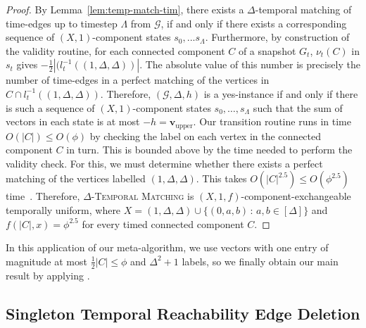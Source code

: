 \documentclass[a4paper,UKenglish,cleveref, autoref, thm-restate]{lipics-v2021} %
\begin{document}
\begin{toappendix}
\begin{proof}
    By Lemma~\ref{lem:temp-match-tim}, there exists a $\Delta$-temporal matching of time-edges up to timestep $\Lambda$ from $\mathcal{G}$, if and only if there exists a corresponding sequence of $(X,1)$-component states $s_0, ... s_{\Lambda}$. Furthermore, by construction of the validity routine, for each connected component $C$ of a snapshot $G_t$, $\nu_t(C)$ in $s_t$ gives $-\frac{1}{2}|(l_t^{-1}((1,\Delta,\Delta))|$. The absolute value of this number is precisely the number of time-edges in a perfect matching of the vertices in $C\cap l^{-1}_t((1,\Delta,\Delta))$. Therefore, $(\mathcal{G},\Delta,h)$ is a yes-instance if and only if there is such a sequence of $(X,1)$-component states $s_0,\ldots,s_{\Lambda}$ such that the sum of vectors in each state is at most $-h=\textbf{v}_{\text{upper}}$. Our transition routine runs in time $O(|C|)\leq O(\phi)$ by checking the label on each vertex in the connected component $C$ in turn. This is bounded above by the time needed to perform the validity check. For this, we must determine whether there exists a perfect matching of the vertices labelled $(1,\Delta,\Delta)$. This takes $O(|C|^{2.5})\leq O(\phi^{2.5})$ time~\cite{micali_ovv_1980}. Therefore, \textsc{$\Delta$-Temporal Matching} is $(X,1,f)$-component-exchangeable temporally uniform, where $X=(1,\Delta,\Delta)\cup \{(0,a,b)\,:\, a,b\in [\Delta]\}$
     and $f(|C|,x)=\phi^{2.5}$ for every timed connected component $C$.
\end{proof}

In this application of our meta-algorithm, we use vectors with one entry of magnitude at most $\frac{1}{2}|C|\leq \phi$ and $\Delta^2+1$ labels, so we finally obtain our main result by applying .

\TIMmatching*


\subsection{Singleton Temporal Reachability Edge Deletion}\label{sec:edge-del}


\end{toappendix}
\end{document}
